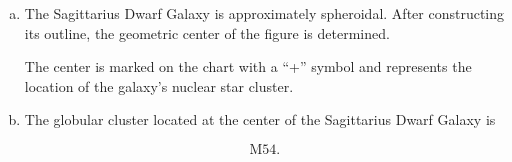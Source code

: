 \documentclass[a4paper,12pt]{extarticle}
\begin{document}
\begin{sol}
\begin{enumerate}[a.]
		The coordinates of the relevant stars are
	\begin{gather*}
				\alpha_\pi=19^{\rm h}10^{\rm m},
		\qquad
		\delta_\pi=-21^\circ02',\\
				\alpha_{h1}=19^{\rm h}37^{\rm m},
		\qquad
		\delta_{h1}=-20^\circ40',\\
		\alpha_\gamma=18^{\rm h}07^{\rm m},
		\qquad
		\delta_\gamma=-30^\circ25'.
	\end{gather*}
	
		
		The angular distance between \(\pi\) Sgr and \(h1\) Sgr is
		
		\[
		\cos\theta_{\pi h1}
		=
		\sin\delta_\pi\sin\delta_{h1}
		+
		\cos\delta_\pi\cos\delta_{h1}
		\cos(\alpha_{h1}-\alpha_\pi),
		\]
		
		which yields
		
		\[
		\theta_{\pi h1}
		=
		7.19^\circ.
		\]
		
		The corresponding projected distance is
		
		\[
		r_{\pi h1}
		=
		2R\tan\left(\frac{\theta_{\pi h1}}{2}\right)
		=
		2(4.02)\tan\left(\frac{7.19^\circ}{2}\right)
		=
		0.505\ {\rm cm}.
		\]
		
		Similarly,
		
		\[
		\cos\theta_{\gamma h1}
		=
		\sin\delta_\gamma\sin\delta_{h1}
		+
		\cos\delta_\gamma\cos\delta_{h1}
		\cos(\alpha_{h1}-\alpha_\gamma),
		\]
		
		giving
		
		\[
		\theta_{\gamma h1}
		=
		20.73^\circ.
		\]
		
		Thus
		
		\[
		r_{\gamma h1}
		=
		2R\tan\left(\frac{\theta_{\gamma h1}}{2}\right)
		=
		2(4.02)\tan\left(\frac{20.73^\circ}{2}\right)
		=
		1.47\ {\rm cm}.
		\]
		
		On the chart, a circle of radius \(0.505\) cm is drawn around \(\pi\) Sgr and a circle of radius \(1.47\) cm is drawn around \(\gamma\) Sgr. Their intersection determines the location of \(h1\) Sgr. The three stars
		\[
		\gamma{\rm\ Sgr},
		\qquad
		\pi{\rm\ Sgr},
		\qquad
		h1{\rm\ Sgr}
		\]
		
		define the visible boundary of the Sagittarius Dwarf Galaxy. An elongated spheroidal outline passing through these stars is then drawn.
		
		\item
		
		The Sagittarius Dwarf Galaxy is approximately spheroidal. After constructing its outline, the geometric center of the figure is determined.
		
		The center is marked on the chart with a ``+'' symbol and represents the location of the galaxy's nuclear star cluster.
		
		\item
		
		The globular cluster located at the center of the Sagittarius Dwarf Galaxy is
		
		\[
		\boxed{\mathrm{M54}}.
		\]
		
	\end{enumerate}
	
\end{sol}
\end{document}
